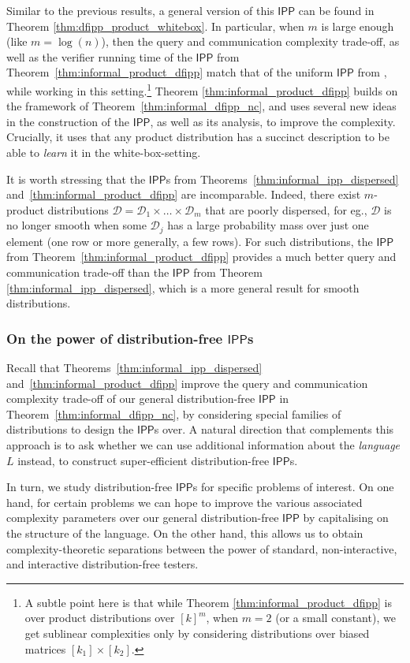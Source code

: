 \documentclass[11pt]{article}
\newcommand{\IPP}{\mathsf{IPP}}
\newcommand{\sD}{\mathcal{D}}
\begin{document}
Similar to the previous results, a general version of this $\IPP$ can be found in Theorem \ref{thm:dfipp_product_whitebox}. In particular, when $m$ is large enough (like $m = \log(n)$), then the query and communication complexity trade-off, as well as the verifier running time of the $\IPP$ from Theorem~\ref{thm:informal_product_dfipp} match that of the uniform $\IPP$ from \cite{RVW}, while working in this setting.\footnote{A subtle point here is that while Theorem \ref{thm:informal_product_dfipp} is over product distributions over $[k]^m$, when $m = 2$ (or a small constant), we get sublinear complexities only by considering distributions over biased matrices $[k_1] \times [k_2]$.} 
Theorem \ref{thm:informal_product_dfipp} builds on the framework of Theorem~\ref{thm:informal_dfipp_nc}, and uses several new ideas in the construction of the $\IPP$, as well as its analysis, to improve the complexity. Crucially, it uses that any product distribution has a succinct description to be able to \textit{learn} it in the white-box-setting. 

It is worth stressing that the $\IPP$s from Theorems~\ref{thm:informal_ipp_dispersed} and~\ref{thm:informal_product_dfipp} are incomparable. Indeed, there exist $m$-product distributions $\sD = \sD_1 \times \dots \times \sD_m$ that are poorly dispersed, for eg., $\sD$ is no longer smooth when some $\sD_j$ has a large probability mass over just one element (one row or more generally, a few rows). For such distributions, the $\IPP$ from Theorem~\ref{thm:informal_product_dfipp} provides a much better query and communication trade-off than the $\IPP$ from Theorem \ref{thm:informal_ipp_dispersed}, which is a more general result for smooth distributions.

\subsubsection{On the power of distribution-free $\IPP$s}
Recall that Theorems~\ref{thm:informal_ipp_dispersed} and~\ref{thm:informal_product_dfipp} improve the query and communication complexity trade-off of our general distribution-free $\IPP$ in Theorem~\ref{thm:informal_dfipp_nc}, by considering special families of distributions to design the $\IPP$s over. A natural direction that complements this approach is to ask whether we can use additional information about the \textit{language} $L$ instead, to construct super-efficient distribution-free $\IPP$s. 

In turn, we study distribution-free $\IPP$s for specific problems of interest. On one hand, for certain problems we can hope to improve the various associated complexity parameters over our general distribution-free $\IPP$ by capitalising on the structure of the language. On the other hand, this allows us to obtain complexity-theoretic separations between the power of standard, non-interactive, and interactive distribution-free testers.
\end{document}

